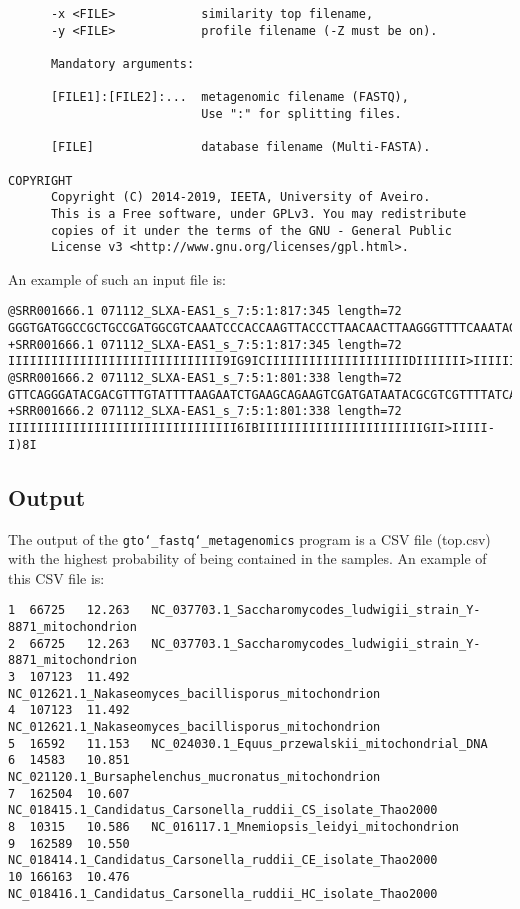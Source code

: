 \begin{lstlisting}
      -x <FILE>            similarity top filename,                      
      -y <FILE>            profile filename (-Z must be on).             
                                                                         
      Mandatory arguments:                                               
                                                                         
      [FILE1]:[FILE2]:...  metagenomic filename (FASTQ),                 
                           Use ":" for splitting files.                
                                                                         
      [FILE]               database filename (Multi-FASTA).              
                                                                         
COPYRIGHT                                                                
      Copyright (C) 2014-2019, IEETA, University of Aveiro.              
      This is a Free software, under GPLv3. You may redistribute         
      copies of it under the terms of the GNU - General Public           
      License v3 <http://www.gnu.org/licenses/gpl.html>.    
\end{lstlisting}
An example of such an input file is:
\begin{lstlisting}
@SRR001666.1 071112_SLXA-EAS1_s_7:5:1:817:345 length=72
GGGTGATGGCCGCTGCCGATGGCGTCAAATCCCACCAAGTTACCCTTAACAACTTAAGGGTTTTCAAATAGA
+SRR001666.1 071112_SLXA-EAS1_s_7:5:1:817:345 length=72
IIIIIIIIIIIIIIIIIIIIIIIIIIIIII9IG9ICIIIIIIIIIIIIIIIIIIIIDIIIIIII>IIIIII/
@SRR001666.2 071112_SLXA-EAS1_s_7:5:1:801:338 length=72
GTTCAGGGATACGACGTTTGTATTTTAAGAATCTGAAGCAGAAGTCGATGATAATACGCGTCGTTTTATCAT
+SRR001666.2 071112_SLXA-EAS1_s_7:5:1:801:338 length=72
IIIIIIIIIIIIIIIIIIIIIIIIIIIIIIII6IBIIIIIIIIIIIIIIIIIIIIIIIGII>IIIII-I)8I
\end{lstlisting}

\subsection*{Output}
The output of the \texttt{gto\char`_fastq\char`_metagenomics} program is a CSV file (top.csv) with the highest probability of being contained in the samples. An example of this CSV file is:
\begin{lstlisting}
1  66725   12.263   NC_037703.1_Saccharomycodes_ludwigii_strain_Y-8871_mitochondrion
2  66725   12.263   NC_037703.1_Saccharomycodes_ludwigii_strain_Y-8871_mitochondrion
3  107123  11.492   NC_012621.1_Nakaseomyces_bacillisporus_mitochondrion
4  107123  11.492   NC_012621.1_Nakaseomyces_bacillisporus_mitochondrion
5  16592   11.153   NC_024030.1_Equus_przewalskii_mitochondrial_DNA
6  14583   10.851   NC_021120.1_Bursaphelenchus_mucronatus_mitochondrion
7  162504  10.607   NC_018415.1_Candidatus_Carsonella_ruddii_CS_isolate_Thao2000
8  10315   10.586   NC_016117.1_Mnemiopsis_leidyi_mitochondrion
9  162589  10.550   NC_018414.1_Candidatus_Carsonella_ruddii_CE_isolate_Thao2000
10 166163  10.476   NC_018416.1_Candidatus_Carsonella_ruddii_HC_isolate_Thao2000
\end{lstlisting}
